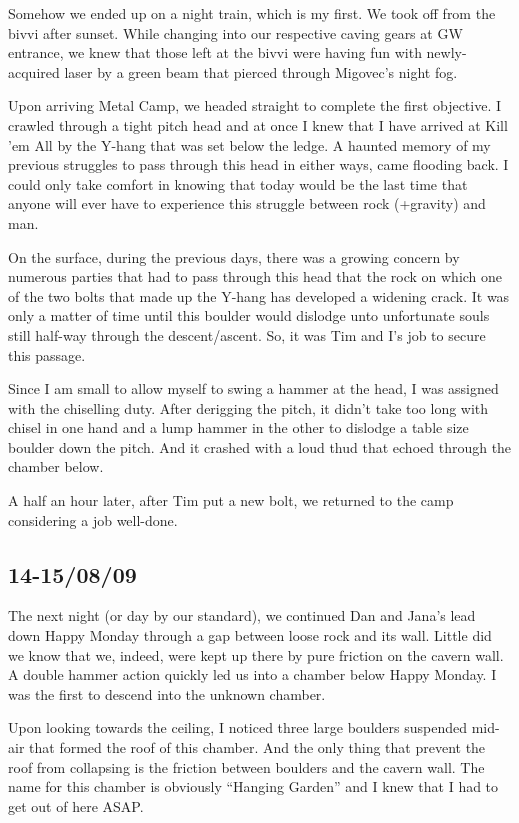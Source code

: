 Somehow we ended up on a night train, which is my first. We took off
from the bivvi after sunset. While changing into our respective caving
gears at GW entrance, we knew that those left at the bivvi were having
fun with newly-acquired laser by a green beam that pierced through
Migovec's night fog.

Upon arriving Metal Camp, we headed straight to complete the first
objective. I crawled through a tight pitch head and at once I knew that
I have arrived at Kill 'em All by the Y-hang that was set below the
ledge. A haunted memory of my previous struggles to pass through this
head in either ways, came flooding back. I could only take comfort in
knowing that today would be the last time that anyone will ever have to
experience this struggle between rock (+gravity) and man.

On the surface, during the previous days, there was a growing concern by
numerous parties that had to pass through this head that the rock on
which one of the two bolts that made up the Y-hang has developed a
widening crack. It was only a matter of time until this boulder would
dislodge unto unfortunate souls still half-way through the
descent/ascent. So, it was Tim and I's job to secure this passage.

Since I am small to allow myself to swing a hammer at the head, I was
assigned with the chiselling duty. After derigging the pitch, it didn't
take too long with chisel in one hand and a lump hammer in the other to
dislodge a table size boulder down the pitch. And it crashed with a loud
thud that echoed through the chamber below.

A half an hour later, after Tim put a new bolt, we returned to the camp
considering a job well-done.


\subsection{14-15/08/09}\label{section-1}

The next night (or day by our standard), we continued Dan and Jana's
lead down Happy Monday through a gap between loose rock and its wall.
Little did we know that we, indeed, were kept up there by pure friction
on the cavern wall. A double hammer action quickly led us into a chamber
below Happy Monday. I was the first to descend into the unknown chamber.

Upon looking towards the ceiling, I noticed three large boulders
suspended mid-air that formed the roof of this chamber. And the only
thing that prevent the roof from collapsing is the friction between
boulders and the cavern wall. The name for this chamber is obviously
``Hanging Garden'' and I knew that I had to get out of here ASAP.

